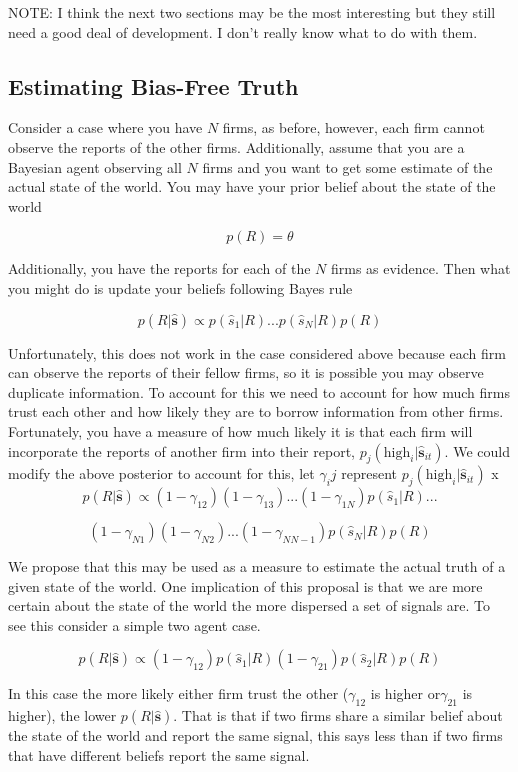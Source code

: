 \documentclass[a4paper]{article}
\begin{document}
NOTE: I think the next two sections may be the most interesting but they still need a good deal of development.  I don't really know what to do with them.

\subsection{Estimating Bias-Free Truth}

Consider a case where you have $N$ firms, as before, however, each firm cannot observe the reports of the other firms.  Additionally, assume that you are a Bayesian agent observing all $N$ firms and you want to get some estimate of the actual state of the world.  You may have your prior belief about the state of the world

\[p(R) = \theta\]

Additionally, you have the reports for each of the $N$ firms as evidence.  Then what you might do is update your beliefs following Bayes rule
 
 \[p(R|\hat{\textbf{s}}) \propto p(\hat{s}_1|R)...p(\hat{s}_N|R)p(R)\]
 
 Unfortunately, this does not work in the case considered above because each firm can observe the reports of their fellow firms, so it is possible you may observe duplicate information.  To account for this we need to account for how much firms trust each other and how likely they are to borrow information from other firms.  Fortunately, you have a measure of how much likely it is that each firm will incorporate the reports of another firm into their report, $p_j(\text{high}_i|\hat{\textbf{s}}_{it})$.  We could modify the above posterior to account for this, let $\gamma_ij$ represent $p_j(\text{high}_i|\hat{\textbf{s}}_{it})$
 x
 \[p(R|\hat{\textbf{s}}) \propto (1-\gamma_{12})(1-\gamma_{13})...(1-\gamma_{1N})p(\hat{s}_1|R)...\]
 
 \[(1-\gamma_{N1})(1-\gamma_{N2})...(1-\gamma_{NN-1})p(\hat{s}_N|R)p(R)\]
 
 We propose that this may be used as a measure to estimate the actual truth of a given state of the world.
  One implication of this proposal is that we are more certain about the state of the world the more dispersed a set of signals are.  To see this consider a simple two agent case.

\[p(R|\hat{\textbf{s}}) \propto (1-\gamma_{12})p(\hat{s}_1|R)(1-\gamma_{21})p(\hat{s}_2|R)p(R)\]

In this case the more likely either firm trust the other ($\gamma_{12}$ is higher or$\gamma_{21}$ is higher), the lower $p(R|\hat{\textbf{s}})$.  That is that if two firms share a similar belief about the state of the world and report the same signal, this says less than if two firms that have different beliefs report the same signal.
\end{document}
